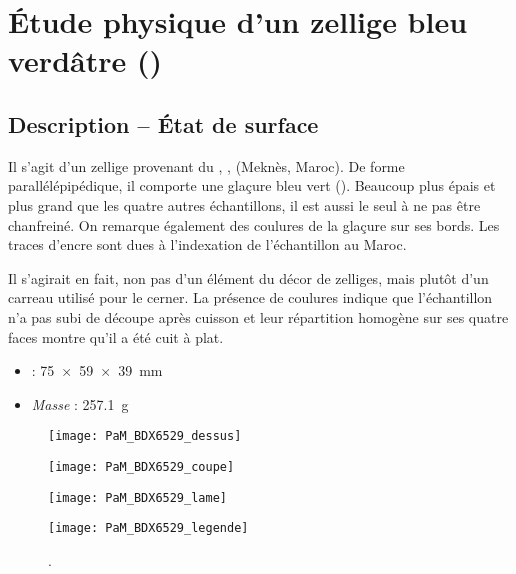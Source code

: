 
\chapter{Étude physique d'un zellige bleu verdâtre ()}

\section{Description -- État de surface}

Il s'agit d'un zellige provenant du \PaM, , (Meknès, 
Maroc). De forme parallélépipédique, il comporte une glaçure bleu vert 
(). Beaucoup plus épais et plus grand que les quatre 
autres échantillons, il est aussi le seul à ne pas être chanfreiné. 
On remarque également des coulures de la glaçure sur ses bords. Les 
traces d'encre sont dues à l'indexation de l'échantillon au Maroc.

Il s'agirait en fait, non pas d'un élément du décor de zelliges, mais 
plutôt d'un carreau utilisé pour le cerner. La présence de coulures 
indique que l'échantillon n'a pas subi de découpe après cuisson et 
leur répartition homogène sur ses quatre faces montre qu'il a été cuit 
à plat.

\begin{itemize}
  \item \DimText : \SI{75x59x39}{\mm}
  \item \emph{Masse} : \SI{257.1}{\g}
\end{itemize}

\begin{figure}[htb]
  \begin{minipage}[t]{8.8cm}
    \centerfloat
    \vspace*{0pt}
    \texttt{[image: PaM\_BDX6529\_dessus]}

    \bigskip
    \bigskip

    \texttt{[image: PaM\_BDX6529\_coupe]}
  \end{minipage}%
  \qquad%
  \begin{minipage}[t]{6.2cm}
    \centerfloat
    \vspace*{0pt}
    \texttt{[image: PaM\_BDX6529\_lame]}

    \bigskip
    \bigskip
    \bigskip

    \texttt{[image: PaM\_BDX6529\_legende]}
  \end{minipage}
  \caption[]{\legendeB.}
  \label{dessin:6529}
\end{figure}

